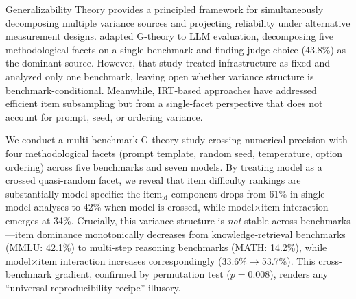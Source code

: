 \documentclass[letterpaper,11pt]{article}
\begin{document}
Generalizability Theory \citep[G-theory;][]{shavelson1991generalizability,brennan2001generalizability} provides a principled framework for simultaneously decomposing multiple variance sources and projecting reliability under alternative measurement designs.
\citet{mesting2026reliability} adapted G-theory to LLM evaluation, decomposing five methodological facets on a single benchmark and finding judge choice (43.8\%) as the dominant source.
However, that study treated infrastructure as fixed and analyzed only one benchmark, leaving open whether variance structure is benchmark-conditional.
Meanwhile, IRT-based approaches \citep{lalor2019learning,polo2024tinybenchmarks} have addressed efficient item subsampling but from a single-facet perspective that does not account for prompt, seed, or ordering variance.

We conduct a multi-benchmark G-theory study crossing numerical precision with four methodological facets (prompt template, random seed, temperature, option ordering) across five benchmarks and seven models.
By treating model as a crossed quasi-random facet, we reveal that item difficulty rankings are substantially model-specific: the item$_{\text{id}}$ component drops from 61\% in single-model analyses to 42\% when model is crossed, while model$\times$item interaction emerges at 34\%.
Crucially, this variance structure is \emph{not} stable across benchmarks---item dominance monotonically decreases from knowledge-retrieval benchmarks (MMLU: 42.1\%) to multi-step reasoning benchmarks (MATH: 14.2\%), while model$\times$item interaction increases correspondingly (33.6\%$\to$53.7\%).
This cross-benchmark gradient, confirmed by permutation test ($p=0.008$), renders any ``universal reproducibility recipe'' illusory.
\end{document}

